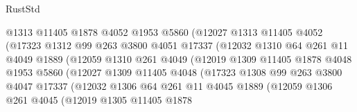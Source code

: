 \begin{lexlean}{RustStd}
\begin{coremodule}
                            @1313
                            @11405
                            @1878
                            @4052
                            @1953
                            @5860
                            (@12027
                              @1313
                              @11405
                              @4052
                              (@17323
                                @1312
                                @99
                                @263
                                @3800
                                @4051
                                @17337
                                (@12032
                                  @1310
                                  @64
                                  @261
                                  @11
                                  @4049
                                  @1889
                                  (@12059
                                    @1310
                                    @261
                                    @4049
                                    (@12019
                                      @1309
                                      @11405
                                      @1878
                                      @4048
                                      @1953
                                      @5860
                                      (@12027
                                        @1309
                                        @11405
                                        @4048
                                        (@17323
                                          @1308
                                          @99
                                          @263
                                          @3800
                                          @4047
                                          @17337
                                          (@12032
                                            @1306
                                            @64
                                            @261
                                            @11
                                            @4045
                                            @1889
                                            (@12059
                                              @1306
                                              @261
                                              @4045
                                              (@12019
                                                @1305
                                                @11405
                                                @1878

\end{coremodule}
\end{lexlean}
